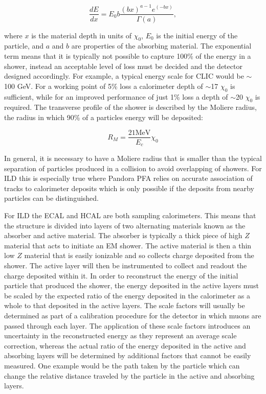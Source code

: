 \begin{equation}
  \label{bethebloch}
\frac{dE}{dx}=E_0 b \frac{(bx)^{a-1}e^(-bx)}{\Gamma(a)},
\end{equation}

where $x$ is the material depth in units of $\chi_0$, $E_0$ is the initial energy of the particle, and $a$ and $b$ are properties of the absorbing material. The exponential term means that it is typically not possible to capture 100\% of the energy in a shower, instead an acceptable level of loss must be decided and the detector designed accordingly. For example, a typical energy scale for \ac{CLIC} would be $\sim$ 100 GeV. For a working point of 5\% loss a calorimeter depth of $\sim$17 $\chi_0$ is sufficient, while for an improved performance of just 1\% loss a depth of $\sim$20 $\chi_0$ is required. The transverse profile of the shower is described by the Moliere radius, the radius in which 90\% of a particles energy will be deposited:

\begin{equation}
R_M=\frac{21\text{MeV}}{E_c}\chi_0
\end{equation}

In general, it is necessary to have a Moliere radius that is smaller than the typical separation of particles produced in a collision to avoid overlapping of showers. For \ac{ILD} this is especially true where Pandora \ac{PFA} relies on accurate association of tracks to calorimeter deposits which is only possible if the deposits from nearby particles can be distinguished.

For \ac{ILD} the \ac{ECAL} and \ac{HCAL} are both sampling calorimeters. This means that the structure is divided into layers of two alternating materials known as the absorber and active material. The absorber is typically a thick piece of high $Z$ material that acts to initiate an \ac{EM} shower. The active material is then a thin low $Z$ material that is easily ionizable and so collects charge deposited from the shower. The active layer will then be instrumented to collect and readout the charge deposited within it. In order to reconstruct the energy of the initial particle that produced the shower, the energy deposited in the active layers must be scaled by the expected ratio of the energy deposited in the calorimeter as a whole to that deposited in the active layers. The scale factors will usually be determined as part of a calibration procedure for the detector in which muons are passed through each layer. The application of these scale factors introduces an uncertainty in the reconstructed energy as they represent an average scale correction, whereas the actual ratio of the energy deposited in the active and absorbing layers will be determined by additional factors that cannot be easily measured. One example would be the path taken by the particle which can change the relative distance traveled by the particle in the active and absorbing layers.

